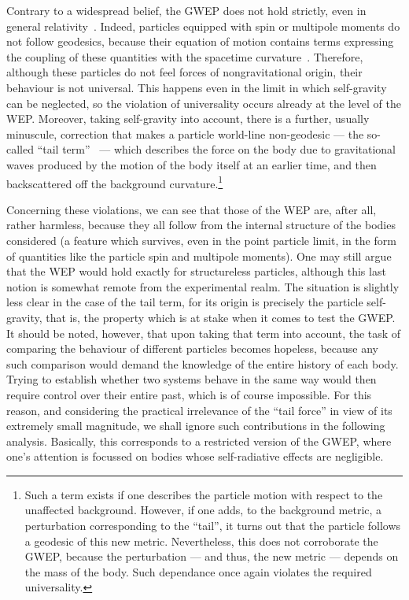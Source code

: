 \documentclass[a4paper,showkeys,aps,prd,reprint,nofootinbib,showpacs,twocolumn]{revtex4-1}
\theoremstyle{plain}
\begin{document}
Contrary to a widespread belief, the GWEP does not hold strictly, even in general relativity~\cite{Poisson:2011nh, Poisson:2004gg}.  Indeed, particles equipped with spin or multipole moments do not follow geodesics, because their equation of motion contains terms expressing the coupling of these quantities with the spacetime curvature~\cite{Papapetrou}.  Therefore, although these particles do not feel forces of nongravitational origin, their behaviour is not universal.  This happens even in the limit in which self-gravity can be neglected, so the violation of universality occurs already at the level of the WEP.  Moreover, taking self-gravity into account, there is a further, usually minuscule, correction that makes a particle world-line non-geodesic --- the so-called ``tail term''~\cite{Mino, QuinnWald} --- which describes the force on the body due to gravitational waves produced by the motion of the body itself at an earlier time, and then backscattered off the background curvature.\footnote{Such a term exists if one describes the particle motion with respect to the unaffected background.  However, if one adds, to the background metric, a perturbation corresponding to the ``tail'', it turns out that the particle follows a geodesic of this new metric.  Nevertheless, this does not corroborate the GWEP, because the perturbation --- and thus, the new metric --- depends on the mass of the body. Such dependance once again violates the required universality.}

Concerning these violations, we can see that those of the WEP are, after all, rather harmless, because they all follow from the internal structure of the bodies considered (a feature which survives, even in the point particle limit, in the form of quantities like the particle spin and multipole moments).  One may still argue that the WEP would hold exactly for structureless particles, although this last notion is somewhat remote from the experimental realm.  The situation is slightly less clear in the case of the tail term, for its origin is precisely the particle self-gravity, that is, the property which is at stake when it comes to test the GWEP.  It should be noted, however, that upon taking that term into account, the task of comparing the behaviour of different particles becomes hopeless, because any such comparison would demand the knowledge of the entire history of each body.  Trying to establish whether two systems behave in the same way would then require control over their entire past, which is of course impossible.  For this reason, and considering the practical irrelevance of the ``tail force'' in view of its extremely small magnitude, we shall ignore such contributions in the following analysis.  Basically, this corresponds to a restricted version of the GWEP, where one's attention is focussed on bodies whose self-radiative effects are negligible.
\end{document}
